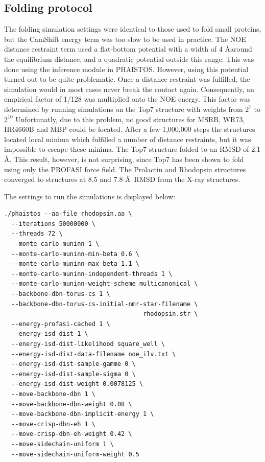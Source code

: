 \subsection{Folding protocol}


The folding simulation settings were identical to those used to fold small proteins, but the CamShift energy term was too slow to be used in practice.
The NOE distance restraint term used a flat-bottom potential with a width of 4 \AA around the equilibrium distance, and a quadratic potential outside this range.
This was done using the inference module in PHAISTOS.
However, using this potential turned out to be quite problematic. 
Once a distance restraint was fulfilled, the simulation would in most cases never break the contact again.
Consequently, an empirical factor of 1/128 was multiplied onto the NOE energy.
This factor was determined by running simulations on the Top7 structure with weights from $2^1$ to $2^{10}$
Unfortunatly, due to this problem, no good structures for MSRB, WR73, HR4660B and MBP could be located. 
After a few 1,000,000 steps the structures located local minima which fulfilled a number of distance restraints, but it was impossible to escape these minima.
The Top7 structure folded to an RMSD of 2.1 \AA.
This result, however, is not surprising, since Top7 has been shown to fold using only the PROFASI force field.
The Prolactin and Rhodopsin structures converged to structures at 8.5 and 7.8 \AA~RMSD from the X-ray structures.

The settings to run the simulations is displayed below:
\begin{lstlisting}
./phaistos --aa-file rhodopsin.aa \
  --iterations 50000000 \
  --threads 72 \
  --monte-carlo-muninn 1 \
  --monte-carlo-muninn-min-beta 0.6 \
  --monte-carlo-muninn-max-beta 1.1 \
  --monte-carlo-muninn-independent-threads 1 \
  --monte-carlo-muninn-weight-scheme multicanonical \
  --backbone-dbn-torus-cs 1 \
  --backbone-dbn-torus-cs-initial-nmr-star-filename \
                                      rhodopsin.str \
  --energy-profasi-cached 1 \
  --energy-isd-dist 1 \
  --energy-isd-dist-likelihood square_well \
  --energy-isd-dist-data-filename noe_ilv.txt \
  --energy-isd-dist-sample-gamme 0 \
  --energy-isd-dist-sample-sigma 0 \
  --energy-isd-dist-weight 0.0078125 \
  --move-backbone-dbn 1 \
  --move-backbone-dbn-weight 0.08 \
  --move-backbone-dbn-implicit-energy 1 \
  --move-crisp-dbn-eh 1 \
  --move-crisp-dbn-eh-weight 0.42 \
  --move-sidechain-uniform 1 \
  --move-sidechain-uniform-weight 0.5
\end{lstlisting}

